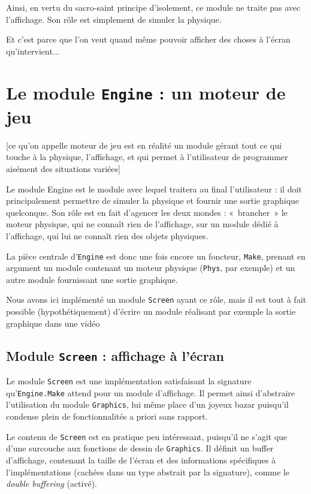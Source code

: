 \documentclass[a4paper]{scrartcl}
\begin{document}
Ainsi, en vertu du sacro-saint principe d'isolement, ce module ne
traite pas avec l'affichage. Son rôle est simplement de simuler la
physique.

Et c'est parce que l'on veut quand même pouvoir afficher des choses à
l'écran qu'intervient...

\section{Le module \texttt{Engine} : un moteur de jeu}

[ce qu'on appelle moteur de jeu est en réalité un module gérant tout
ce qui touche à la physique, l'affichage, et qui permet à
l'utilisateur de programmer aisément des situations variées]

Le module Engine est le module avec lequel traitera au final
l'utilisateur : il doit principalement permettre de simuler la
physique et fournir une sortie graphique quelconque. Son rôle est en
fait d'agencer les deux mondes : «~brancher~» le moteur physique, qui
ne connaît rien de l'affichage, sur un module dédié à l'affichage, qui
lui ne connaît rien des objets physiques.

La pièce centrale d'\texttt{Engine} est donc une fois encore un
foncteur, \texttt{Make}, prenant en argument un module contenant un
moteur physique (\texttt{Phys}, par exemple) et un autre module
fournissant une sortie graphique.

Nous avons ici implémenté un module \texttt{Screen} ayant ce rôle,
mais il est tout à fait possible (hypothétiquement) d'écrire un module
réalisant par exemple la sortie graphique dans une vidéo

\subsection{Module \texttt{Screen} : affichage à l'écran}
Le module \texttt{Screen} est une implémentation satisfaisant la
signature qu'\texttt{Engine.Make} attend pour un module
d'affichage. Il permet ainsi d'abstraire l'utilisation du module
\texttt{Graphics}, lui même place d'un joyeux bazar puisqu'il condense
plein de fonctionnalités a priori sans rapport.

Le contenu de \texttt{Screen} est en pratique peu intéressant,
puisqu'il ne s'agit que d'une surcouche aux fonctions de dessin de
\texttt{Graphics}. Il définit un buffer d'affichage, contenant la
taille de l'écran et des informations spécifiques à l'implémentations
(cachées dans un type abstrait par la signature), comme le
\emph{double buffering} (activé).
\end{document}
